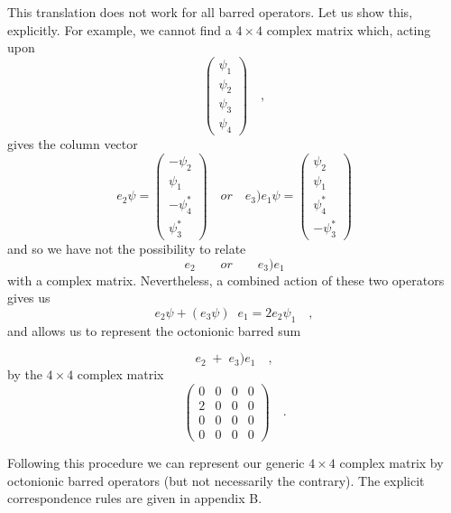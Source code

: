 \documentclass[a4paper,12pt]{book}
\begin{document}
This translation does not work for all barred operators. Let us show this,
explicitly. For example, we cannot find a $4\times 4$ complex matrix which,
acting upon 
\[
\left( 
\begin{array}{c}
{\psi _{1}} \\ 
{\psi _{2}} \\ 
{\psi _{3}} \\ 
{\psi _{4}}
\end{array}
\right) \quad , 
\]
gives the column vector 
\[
e_{2}\psi =\left( 
\begin{array}{c}
-{\psi _{2}} \\ 
{\psi _{1}} \\ 
-{\psi _{4}^{*}} \\ 
{\psi _{3}^{*}}
\end{array}
\right) \quad or\quad e_{3}\mathbf{)}e_{1}\psi =\left( 
\begin{array}{c}
{\psi _{2}} \\ 
{\psi _{1}} \\ 
{\psi _{4}^{*}} \\ 
-{\psi _{3}^{*}}
\end{array}
\right) 
\]
and so we have not the possibility to relate 
\[
e_{2}\quad \quad or\quad \quad e_{3}\mathbf{)}e_{1} 
\]
with a complex matrix. Nevertheless, a combined action of these two
operators gives us 
\[
e_{2}\psi +(e_{3}\psi )\;\;e_{1}=2e_{2}\psi _{1}\quad , 
\]
and allows us to represent the octonionic barred sum

\begin{equation}
e_{2}\;+\;e_{3}\mathbf{)}e_{1}\quad ,
\end{equation}
by the $4\times 4$ complex matrix 
\begin{equation}
\left( 
\begin{array}{cccc}
{0} & {0} & {0} & {0} \\ 
2 & 0 & 0 & 0 \\ 
0 & 0 & 0 & 0 \\ 
0 & 0 & 0 & 0
\end{array}
\right) \quad .  \label{ct}
\end{equation}

Following this procedure we can represent our generic $4\times 4$ complex
matrix by octonionic barred operators (but not necessarily the contrary).
The explicit correspondence rules are given in appendix B.
\end{document}
